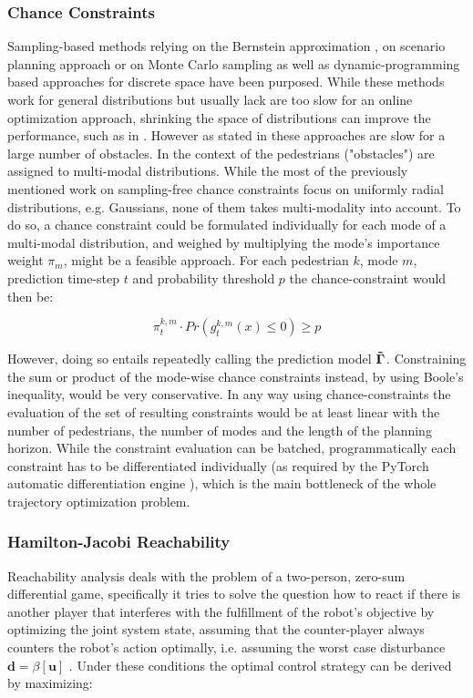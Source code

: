\subsubsection{Chance Constraints}
Sampling-based methods relying on the Bernstein approximation \cite{Calafiore2005}, on scenario planning approach \cite{Bemporad1999} or on Monte Carlo sampling \cite{Hong2011}\cite{Janson2015} as well as dynamic-programming based approaches for discrete space \cite{Yin-LamChow2013}\cite{Ono2015} \cite{Chow2015a} have been purposed. While these methods work for general distributions but usually lack are too slow for an online optimization approach, shrinking the space of distributions can improve the performance, such as in \cite{Calafiore2006}\cite{Carvalho2014}\cite{Blackmore2009}\cite{Blackmore2011}. 
\newline
However as stated in \cite{Lew2020} these approaches are slow for a large number of obstacles. In the context of \project the pedestrians ("obstacles") are assigned to multi-modal distributions. While the most of the previously mentioned work on sampling-free chance constraints focus on uniformly radial distributions, e.g. Gaussians, none of them takes multi-modality into account. To do so, a chance constraint could be formulated individually for each mode of a multi-modal distribution, and weighed by multiplying the mode's importance weight $\pi_m$, might be a feasible approach. For each pedestrian $k$, mode $m$, prediction time-step $t$ and probability threshold $p$ the chance-constraint would then be:

\begin{equation}
\pi_t^{k,m} \cdot Pr(g_t^{k,m}(x)\leq 0) \geq p
\end{equation}

However, doing so entails repeatedly calling the prediction model $\distmodel[]$. Constraining the sum or product of the mode-wise chance constraints instead, by using Boole's inequality, would be very conservative. In any way using chance-constraints the evaluation of the set of resulting constraints would be at least linear with the number of pedestrians, the number of modes and the length of the planning horizon. While the constraint evaluation can be batched, programmatically each constraint has to be differentiated individually (as required by the PyTorch automatic differentiation engine \cite{pytorch}), which is the main bottleneck of the whole trajectory optimization problem. 

\subsubsection{Hamilton-Jacobi Reachability} 
Reachability analysis deals with the problem of a two-person, zero-sum differential game, specifically it tries to solve the question how to react if there is another player that interferes with the fulfillment of the robot's objective by optimizing the joint system state, assuming that the counter-player always counters the robot's action optimally, i.e. assuming the worst case disturbance $\boldsymbol{d} = \beta[\boldsymbol{u}]$ \cite{Pavone2020}. Under these conditions the optimal control strategy can be derived by maximizing: \\

